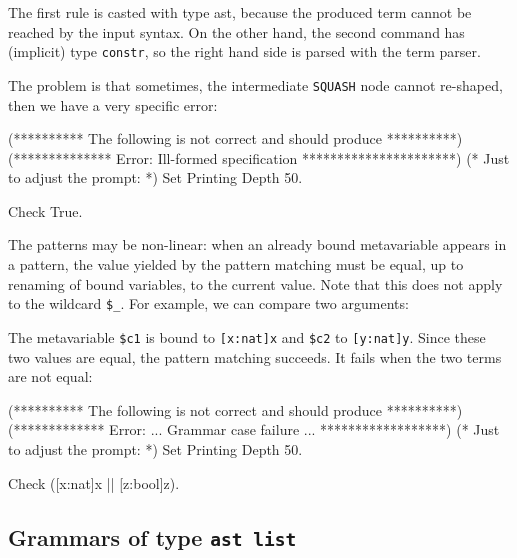 {The first rule is casted with type ast, because the produced term
cannot be reached by the input syntax. On the other hand, the second
command has (implicit) type \verb+constr+, so the right hand side is
parsed with the term parser.

\noindent The problem is that sometimes, the intermediate {\tt SQUASH}
node cannot re-shaped, then we have a very specific error:

\begin{coq_eval}
(********** The following is not correct and should produce **********)
(************** Error: Ill-formed specification **********************)
(* Just to adjust the prompt: *) Set Printing Depth 50.
\end{coq_eval}
\begin{coq_example}
Check {True}.
\end{coq_example}



The patterns may be non-linear: when an already bound metavariable
appears in a pattern, the value yielded by the pattern matching must
be equal, up to renaming of bound variables, to the current
value. Note that this does not apply to the wildcard \verb+$_+. For
example, we can compare two arguments:


\noindent The metavariable \verb+$c1+ is bound to \verb+[x:nat]x+ and
\verb+$c2+ to \verb+[y:nat]y+. Since these two values are equal, the
pattern matching succeeds. It fails when the two terms are not equal:

\begin{coq_eval}
(********** The following is not correct and should produce **********)
(************* Error: ...  Grammar case failure ... ******************)
(* Just to adjust the prompt: *) Set Printing Depth 50.
\end{coq_eval}
\begin{coq_example}
Check ([x:nat]x || [z:bool]z).
\end{coq_example}



\subsection{Grammars of type {\tt ast list}}

}
